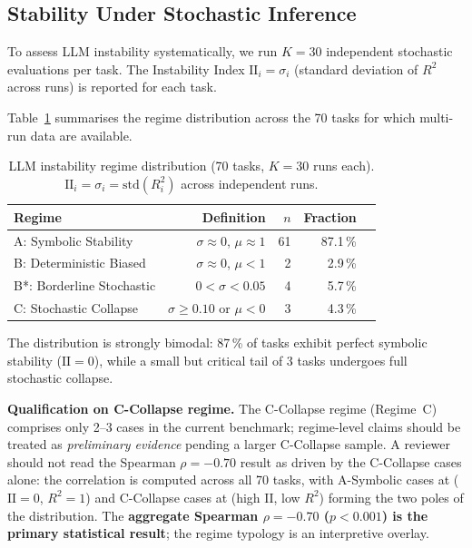 \documentclass[twoside,11pt]{article}
\newcommand{\Rsq}{R^{2}}
\newcommand{\II}{\mathrm{II}}
\begin{document}
\subsection{Stability Under Stochastic Inference}\label{subsec:stability-under-stochastic-inference}
\label{sec:instability_results}

To assess LLM instability systematically, we run $K=30$ independent stochastic
evaluations per task.  The Instability Index $\II_i = \sigma_i$ (standard deviation
of $\Rsq$ across runs) is reported for each task.

Table~\ref{tab:instability} summarises the regime distribution across the 70 tasks
for which multi-run data are available.

\begin{table}[h]
\centering
\caption{LLM instability regime distribution (70 tasks, $K=30$ runs each).
$\II_i = \sigma_i = \mathrm{std}(R^2_i)$ across independent runs.}
\label{tab:instability}
\begin{tabular}{lrrrr}
\toprule
Regime & Definition & $n$ & Fraction \\
\midrule
A: Symbolic Stability   & $\sigma\approx0$, $\mu\approx1$            & 61 & 87.1\,\% \\
B: Deterministic Biased & $\sigma\approx0$, $\mu<1$                  &  2 & 2.9\,\%  \\
B*: Borderline Stochastic & $0 < \sigma < 0.05$                      &  4 & 5.7\,\%  \\
C: Stochastic Collapse  & $\sigma \ge 0.10$ or $\mu < 0$             &  3 & 4.3\,\%  \\
\bottomrule
\end{tabular}
\end{table}

The distribution is strongly bimodal: 87\,\% of tasks exhibit perfect symbolic
stability ($\II=0$), while a small but critical tail of 3 tasks undergoes full
stochastic collapse.

\textbf{Qualification on C-Collapse regime.}  The C-Collapse regime
(Regime~C) comprises only 2--3 cases in the current benchmark; regime-level
claims should be treated as \emph{preliminary evidence} pending a larger
C-Collapse sample.  A reviewer should not read the Spearman $\rho=-0.70$ result
as driven by the C-Collapse cases alone: the correlation is computed across all
70 tasks, with A-Symbolic cases at ($\II=0$, $\Rsq=1$) and C-Collapse cases at
(high $\II$, low $\Rsq$) forming the two poles of the distribution.  The
\textbf{aggregate Spearman $\rho=-0.70$ ($p<0.001$) is the primary statistical
result}; the regime typology is an interpretive overlay.
\end{document}
